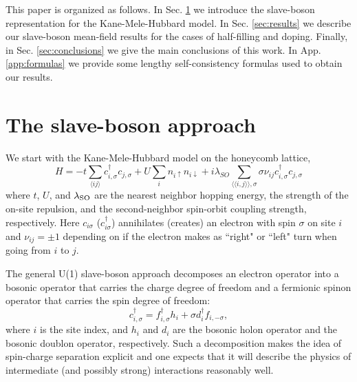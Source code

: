 \documentclass[aps,prb,twocolumn,superscriptaddress,showpacs]{revtex4-1}
\begin{document}
This paper is organized as follows.  In Sec. \ref{sec:slave} we introduce the slave-boson representation for the Kane-Mele-Hubbard model.  In Sec. \ref{sec:results} we describe our slave-boson mean-field results for the cases of half-filling and doping.  Finally, in Sec.
\ref{sec:conclusions} we give the main conclusions of this work. In App. \ref{app:formulas} we provide some lengthy self-consistency formulas used to obtain our results.

\section{The slave-boson approach}
\label{sec:slave}
We start with the Kane-Mele-Hubbard model on the honeycomb lattice,
\begin{equation}
\label{KMH-model}
H=-t \sum_{\langle ij \rangle} c^{\dag}_{i,\sigma}c_{j,\sigma}+U\sum_{i} n_{i\uparrow}n_{i\downarrow} + i\lambda_{SO}\sum_{\langle\langle i,j \rangle\rangle,\sigma}\sigma\nu_{ij}c^{\dag}_{i,\sigma}c_{j,\sigma}
\end{equation}
where $t$, $U$, and $\lambda_{\rm{SO}}$ are the nearest neighbor hopping energy, the strength of the on-site repulsion, and  the second-neighbor spin-orbit coupling strength, respectively. Here $c_{i\sigma}$ ($c_{i\sigma}^{\dag}$) annihilates (creates) an electron with spin $\sigma$ on site $i$ and $\nu_{ij}=\pm 1$ depending on if the electron makes as ``right" or ``left" turn when going from $i$ to $j$.\cite{Kane:prl05,Kane_2:prl05}

The general U(1) slave-boson approach decomposes an electron operator into a bosonic operator that carries the charge degree of freedom and a fermionic spinon operator that carries the spin degree of freedom:\cite{Barnes:jpf76,Coleman:prb84,Zou:prb88,Wen:rmp06,Vaezi:10}
\begin{equation}
\label{slave-boson-decomposition}
c^{\dag}_{i,\sigma}=f^{\dag}_{i,\sigma}h_i+\sigma d^{\dag}_i f_{i,-\sigma},
\end{equation}
where $i$ is the site index, and $h_i$ and $d_i$ are the bosonic holon operator and the bosonic doublon operator, respectively. Such a decomposition makes the idea of spin-charge separation explicit and one expects that it will describe the physics of intermediate (and possibly strong) interactions reasonably well.
\end{document}
